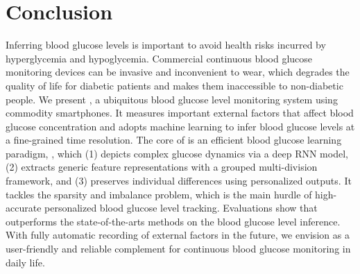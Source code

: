 
\section{Conclusion}
\label{sec:conclusion}
Inferring blood glucose levels is important to avoid health risks incurred by hyperglycemia and hypoglycemia.
Commercial continuous blood glucose monitoring devices can be invasive and inconvenient to wear, which degrades the quality of life for diabetic patients and makes them inaccessible to non-diabetic people.
We present \sysname, a ubiquitous blood glucose level monitoring system using commodity smartphones.
It measures important external factors that affect blood glucose concentration and adopts machine learning to infer blood glucose levels at a fine-grained time resolution.
The core of \sysname is an efficient blood glucose learning paradigm, \modelname, which (1) depicts complex glucose dynamics via a deep RNN model, (2) extracts generic feature representations with a grouped multi-division framework, and (3) preserves individual differences using personalized outputs.
It tackles the sparsity and imbalance problem, which is the main hurdle of high-accurate personalized blood glucose level tracking.
Evaluations show that \modelname outperforms the state-of-the-arts methods on the blood glucose level inference.
With fully automatic recording of external factors in the future, we envision \sysname as a user-friendly and reliable complement for continuous blood glucose monitoring in daily life.

